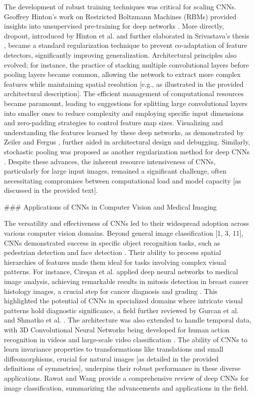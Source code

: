 \documentclass{article}
\begin{document}
The development of robust training techniques was critical for scaling CNNs. Geoffrey Hinton's work on Restricted Boltzmann Machines (RBMs) provided insights into unsupervised pre-training for deep networks \cite{7}. More directly, dropout, introduced by Hinton et al. \cite{8} and further elaborated in Srivastava's thesis \cite{16}, became a standard regularization technique to prevent co-adaptation of feature detectors, significantly improving generalization. Architectural principles also evolved; for instance, the practice of stacking multiple convolutional layers before pooling layers became common, allowing the network to extract more complex features while maintaining spatial resolution [e.g., as illustrated in the provided architectural description]. The efficient management of computational resources became paramount, leading to suggestions for splitting large convolutional layers into smaller ones to reduce complexity and employing specific input dimensions and zero-padding strategies to control feature map sizes. Visualizing and understanding the features learned by these deep networks, as demonstrated by Zeiler and Fergus \cite{21}, further aided in architectural design and debugging. Similarly, stochastic pooling was proposed as another regularization method for deep CNNs \cite{20}. Despite these advances, the inherent resource intensiveness of CNNs, particularly for large input images, remained a significant challenge, often necessitating compromises between computational load and model capacity [as discussed in the provided text].

\#\#\# Applications of CNNs in Computer Vision and Medical Imaging

The versatility and effectiveness of CNNs led to their widespread adoption across various computer vision domains. Beyond general image classification [1, 3, 11], CNNs demonstrated success in specific object recognition tasks, such as pedestrian detection \cite{17} and face detection \cite{19}. Their ability to process spatial hierarchies of features made them ideal for tasks involving complex visual patterns. For instance, Cireşan et al. applied deep neural networks to medical image analysis, achieving remarkable results in mitosis detection in breast cancer histology images, a crucial step for cancer diagnosis and grading \cite{2}. This highlighted the potential of CNNs in specialized domains where intricate visual patterns hold diagnostic significance, a field further reviewed by Gurcan et al. \cite{2009} and Shmatko et al. \cite{2022}. The architecture was also extended to handle temporal data, with 3D Convolutional Neural Networks being developed for human action recognition in videos \cite{9} and large-scale video classification \cite{10}. The ability of CNNs to learn invariance properties to transformations like translations and small diffeomorphisms, crucial for natural images [as detailed in the provided definitions of symmetries], underpins their robust performance in these diverse applications. Rawat and Wang \cite{2017} provide a comprehensive review of deep CNNs for image classification, summarizing the advancements and applications in the field.
\end{document}
